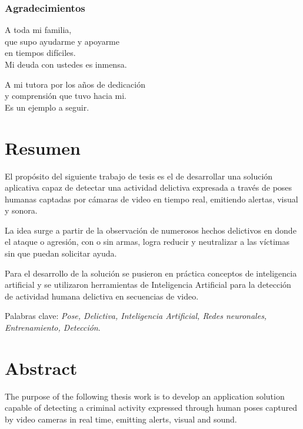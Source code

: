 \documentclass[a4paper,12pt,oneside,spanish]{book}
\begin{document}
\newpage
\begin{flushright}
	\subsection*{Agradecimientos}
	A toda mi familia, \\
	que supo ayudarme y apoyarme \\
	en tiempos difíciles. \\
	Mi deuda con ustedes es inmensa.\par
	
	A mi tutora por los años de dedicación\\
	y comprensión que tuvo hacia mi.\\
	Es un ejemplo a seguir.\\
	
\end{flushright}

\newpage
\tableofcontents

\newpage
\listoffigures

\newpage
\clearpage
\thispagestyle{fancy}
\setlength{\parskip}{1.3em}
\chapter{Resumen}
El propósito del siguiente trabajo de tesis es el de desarrollar una solución aplicativa capaz de detectar una actividad delictiva expresada a través de poses humanas captadas por cámaras de video en tiempo real, emitiendo alertas, visual y sonora. \par 

La idea surge a partir de la observación de numerosos hechos delictivos en donde el ataque o agresión, con o sin armas, logra reducir y neutralizar a las víctimas sin que puedan solicitar ayuda.\par 

Para el desarrollo de la solución se pusieron en práctica conceptos de inteligencia artificial y se utilizaron herramientas de Inteligencia Artificial para la detección de actividad humana delictiva en secuencias de video.\par 

Palabras clave: \textit{Pose, Delictiva, Inteligencia Artificial, Redes neuronales, Entrenamiento, Detección}.

\newpage
\clearpage
\thispagestyle{fancy}
\setlength{\parskip}{1.3em}
\chapter{Abstract}
The purpose of the following thesis work is to develop an application solution capable of detecting a criminal activity expressed through human poses captured by video cameras in real time, emitting alerts, visual and sound. \par
\end{document}
